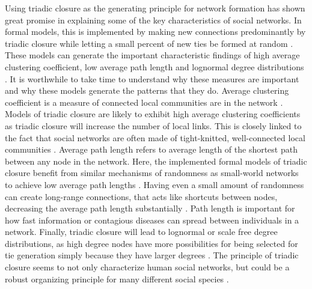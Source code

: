\documentclass{article}
\begin{document}
Using triadic closure as the generating principle for network formation has shown great promise in explaining some of the key characteristics of social networks. In formal models, this is implemented by making new connections predominantly by triadic closure while letting a small percent of new ties be formed at random \cite{ilany_social_2016,jackson_search_2004,jackson_meeting_2007}. These models can generate the important characteristic findings of high average clustering coefficient, low average path length and lognormal degree distributions \cite{jackson_search_2004,jackson_meeting_2007}. 
It is worthwhile to take time to understand why these measures are important and why these models generate the patterns that they do. Average clustering coefficient is a measure of connected local communities are in the network \cite{watts_collective_1998}. Models of triadic closure are likely to exhibit high average clustering coefficients as triadic closure will increase the number of local links. This is closely linked to the fact that social networks are often made of tight-knitted, well-connected local communities \cite{peixoto_disentangling_2022}. Average path length refers to average length of the shortest path between any node in the network. Here, the implemented formal models of triadic closure benefit from similar mechanisms of randomness as small-world networks to achieve low average path lengths \cite{jackson_meeting_2007,watts_collective_1998}. Having even a small amount of randomness can create long-range connections, that acts like shortcuts between nodes, decreasing the average path length substantially \cite{watts_networks_1999}. Path length is important for how fast information or contagious diseases can spread between individuals in a network. Finally, triadic closure will lead to lognormal or scale free degree distributions, as high degree nodes have more possibilities for being selected for tie generation simply because they have larger degrees \cite{jackson_meeting_2007}. The principle of triadic closure seems to not only characterize human social networks, but could be a robust organizing principle for many different social species \cite{ilany_social_2016}. 
\end{document}
